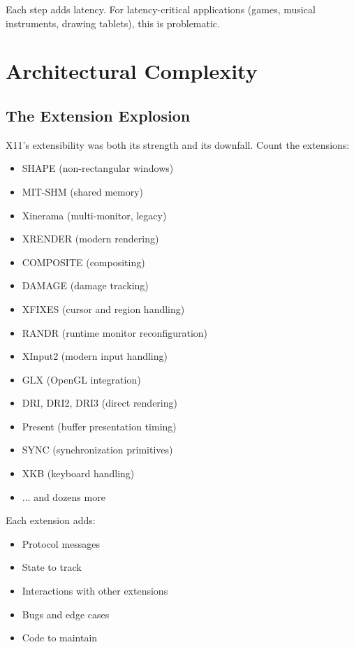 Each step adds latency. For latency-critical applications (games, musical instruments, drawing tablets), this is problematic.

\section{Architectural Complexity}

\subsection{The Extension Explosion}

X11's extensibility was both its strength and its downfall. Count the extensions:

\begin{itemize}
    \item SHAPE (non-rectangular windows)
    \item MIT-SHM (shared memory)
    \item Xinerama (multi-monitor, legacy)
    \item XRENDER (modern rendering)
    \item COMPOSITE (compositing)
    \item DAMAGE (damage tracking)
    \item XFIXES (cursor and region handling)
    \item RANDR (runtime monitor reconfiguration)
    \item XInput2 (modern input handling)
    \item GLX (OpenGL integration)
    \item DRI, DRI2, DRI3 (direct rendering)
    \item Present (buffer presentation timing)
    \item SYNC (synchronization primitives)
    \item XKB (keyboard handling)
    \item ... and dozens more
\end{itemize}

Each extension adds:
\begin{itemize}
    \item Protocol messages
    \item State to track
    \item Interactions with other extensions
    \item Bugs and edge cases
    \item Code to maintain
\end{itemize}

